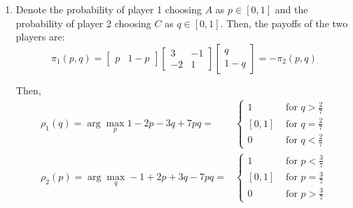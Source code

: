 \documentclass[]{article}
\begin{document}
\begin{enumerate}[label=(\roman*)]
	\item Denote the probability of player 1 choosing $A$ as $p\in[0 ,1]$ and the probability of player 2 choosing $C$ as $q\in[0, 1]$. Then, the payoffs of the two players are:
	\begin{equation}
	\pi_1(p, q) = \begin{bmatrix}p & 1 - p\end{bmatrix}\begin{bmatrix}3 & -1 \\ -2 & 1\end{bmatrix}\begin{bmatrix}q \\ 1 - q\end{bmatrix} = -\pi_2(p, q) \nonumber
	\end{equation}
	
	Then, 
	\begin{equation}
		\begin{split}
		\rho_1(q) = \arg\max\limits_{p}1 - 2p - 3q + 7pq = &\begin{cases}
		1&\text{ for }q > \frac{2}{7} \\
		[0, 1]&\text{ for }q = \frac{2}{7} \\
		0&\text{ for }q < \frac{2}{7}
		\end{cases}\\ \nonumber
		\rho_2(p) = \arg\max\limits_{q} -1 + 2p + 3q - 7pq = &\begin{cases}
		1&\text{ for }p < \frac{3}{7} \\
		[0, 1]&\text{ for }p = \frac{3}{7} \\
		0&\text{ for }p > \frac{3}{7}
		\end{cases}
		\end{split}
	\end{equation}
	\begin{figure}[h]
		\centering
\end{figure}
\end{enumerate}
\end{document}

